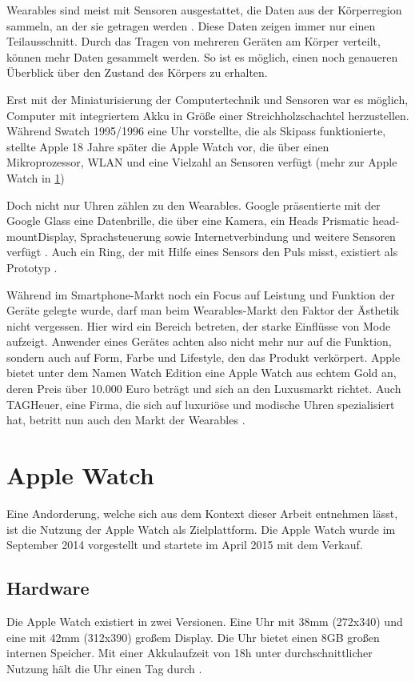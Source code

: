 Wearables sind meist mit Sensoren ausgestattet, die Daten aus der Körperregion sammeln, an der sie getragen werden \cite{4711366}. Diese Daten zeigen immer nur einen Teilausschnitt. Durch das Tragen von mehreren Geräten am Körper verteilt, können mehr Daten gesammelt werden. So ist es möglich, einen noch genaueren Überblick über den Zustand des Körpers zu erhalten\cite{4711366}.

Erst mit der Miniaturisierung der Computertechnik und Sensoren war es möglich, Computer mit integriertem Akku in Größe einer Streichholzschachtel herzustellen. Während Swatch 1995/1996 eine Uhr vorstellte, die als Skipass funktionierte, stellte Apple 18 Jahre später die Apple Watch vor, die über einen Mikroprozessor, WLAN und eine Vielzahl an Sensoren verfügt (mehr zur Apple Watch in \ref{ch:apple-watch})

Doch nicht nur Uhren zählen zu den Wearables. Google präsentierte mit der Google Glass eine Datenbrille, die über eine Kamera, ein Heads \glqq Prismatic head-mount\glqq  Display, Sprachsteuerung sowie Internetverbindung und weitere Sensoren verfügt \cite{Muensterer2014281}. Auch ein Ring, der mit Hilfe eines Sensors den Puls misst, existiert als Prototyp \cite{4711366}.

Während im Smartphone-Markt noch ein Focus auf Leistung und Funktion der Geräte gelegte wurde, darf man beim Wearables-Markt den Faktor der Ästhetik nicht vergessen. Hier wird ein Bereich betreten, der starke Einflüsse von Mode aufzeigt. Anwender eines Gerätes achten also nicht mehr nur auf die Funktion, sondern auch auf Form, Farbe und Lifestyle, den das Produkt verkörpert. Apple bietet unter dem Namen \glqq Watch Edition \grqq eine Apple Watch aus echtem Gold an, deren Preis über 10.000 Euro beträgt und sich an den Luxusmarkt richtet. Auch TAGHeuer, eine Firma, die sich auf luxuriöse und modische Uhren spezialisiert hat, betritt nun auch den Markt der Wearables \cite{TAGHeuer:20015aa}.

\section{Apple Watch}
\label{ch:apple-watch}
Eine Andorderung, welche sich aus dem Kontext dieser Arbeit entnehmen lässt, ist die Nutzung der Apple Watch als Zielplattform. Die Apple Watch wurde im September 2014 vorgestellt und startete im April 2015 mit dem Verkauf.
\subsection{Hardware}
Die Apple Watch existiert in zwei Versionen. Eine Uhr mit 38mm (272x340) und eine mit 42mm (312x390) großem Display. Die Uhr bietet einen 8GB großen internen Speicher. Mit einer Akkulaufzeit von 18h unter durchschnittlicher Nutzung hält die Uhr einen Tag durch \cite{Riches:2015aa}. 
